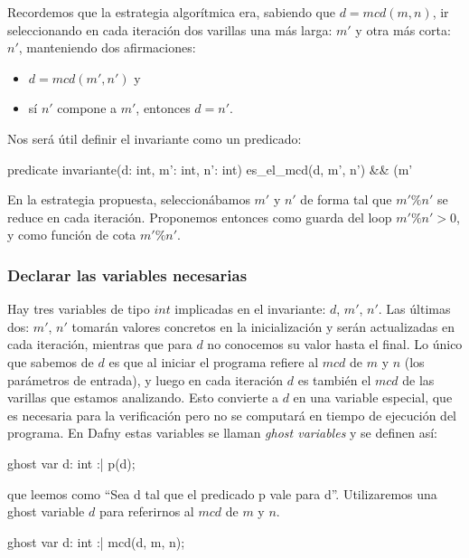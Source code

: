 \documentclass[12pt, a4paper, openany, fleqn]{book}
\begin{document}
    Recordemos que la estrategia algorítmica era, sabiendo que $d = mcd(m, n)$, ir seleccionando en cada iteración dos varillas una más larga: $m'$ y otra más corta: $n'$, manteniendo dos afirmaciones:
    \begin{itemize}
        \item $d = mcd(m', n')$ y
        \item sí $n'$ compone a $m'$, entonces $d = n'$.
    \end{itemize}

    Nos será útil definir el invariante como un predicado:

    \begin{dafny}
predicate invariante(d: int, m': int, n': int) {
    es_el_mcd(d, m', n')
    && (m' %
}
    \end{dafny}

    En la estrategia propuesta, seleccionábamos $m'$ y $n'$ de forma tal que $m'\%n'$ se reduce en cada iteración. Proponemos entonces como guarda del loop $m'\%n'>0$, y como función de cota $m'\%n'$.

    \subsubsection{Declarar las variables necesarias}
    Hay tres variables de tipo $int$ implicadas en el invariante: $d$, $m'$, $n'$.
    Las últimas dos: $m'$, $n'$ tomarán valores concretos en la inicialización y serán actualizadas en cada iteración, mientras que para $d$ no conocemos su valor hasta el final. Lo único que sabemos de $d$ es que al iniciar el programa refiere al $mcd$ de $m$ y $n$ (los parámetros de entrada), y luego en cada iteración $d$ es también el $mcd$ de las varillas que estamos analizando. Esto convierte a $d$ en una variable especial, que es necesaria para la verificación pero no se computará en tiempo de ejecución del programa. En Dafny estas variables se llaman \textit{ghost variables} y se definen así:

    \begin{dafny}
ghost var d: int :| p(d);
    \end{dafny}

    \noindent que leemos como ``Sea d tal que el predicado p vale para d''. Utilizaremos una ghost variable $d$ para referirnos al $mcd$ de $m$ y $n$.

    \begin{dafny}
ghost var d: int :| mcd(d, m, n);
    \end{dafny}
\end{document}
